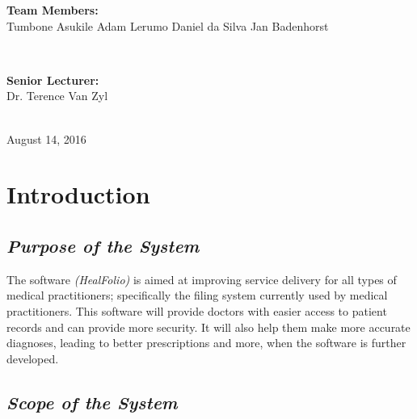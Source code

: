 \documentclass[a4paper]{article}
\begin{document}
\begin{titlepage}
\begin{minipage}{0.4\textwidth}
\begin{flushleft}
\textbf{Team Members:} \\[0.3cm]

Tumbone Asukile\newline
Adam Lerumo\newline
Daniel da Silva\newline
Jan Badenhorst\newline

\end{flushleft}

\end{minipage} \\[0.7cm]

\begin{minipage}{0.4\textwidth}

\begin{flushright} \large

\textbf{Senior Lecturer:} \\[0.3cm]

Dr. Terence Van Zyl

\end{flushright}

\end{minipage} \\[1cm]

{\large August 14, 2016} 
    
\end{titlepage}

\setlength\parindent{24pt}

\newpage

\section{Introduction}

\subsection{\textit{Purpose of the System}}

The software \emph{(HealFolio)} is aimed at improving service delivery for all types of medical practitioners; specifically the filing system currently used by medical practitioners. This software will provide doctors with easier access to patient records and can provide more security. It will also help them make more accurate diagnoses, leading to better prescriptions and more, when the software is further developed. 
		
\subsection{\textit{Scope of the System}}
\end{document}
